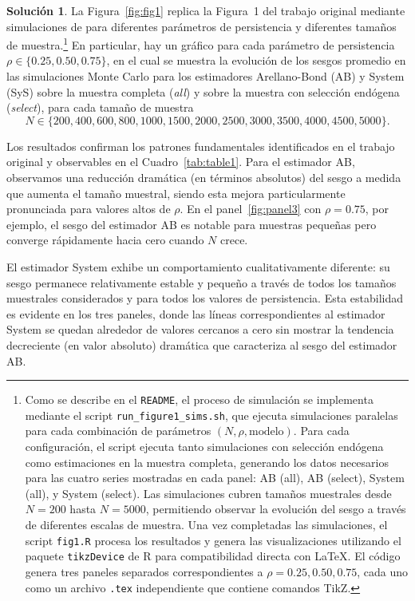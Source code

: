 \documentclass[12pt,letterpaper,reqno,oneside]{amsart}
\theoremstyle{problemstyle} %
\theoremstyle{definition} %
\newtheorem{solution}{Solución}[problem]
\begin{document}
\begin{solution}
  La Figura~\ref{fig:fig1} replica la Figura~1 del trabajo original mediante simulaciones de para diferentes parámetros de persistencia y diferentes tamaños de muestra.\footnote{Como se describe en el \texttt{README}, el proceso de simulación se implementa mediante el script \texttt{run\_figure1\_sims.sh}, que ejecuta simulaciones paralelas para cada combinación de parámetros $(N, \rho, \text{modelo})$.
    Para cada configuración, el script ejecuta tanto simulaciones con selección endógena como estimaciones en la muestra completa, generando los datos necesarios para las cuatro series mostradas en cada panel: AB (all), AB (select), System (all), y System (select).
    Las simulaciones cubren tamaños muestrales desde $N = 200$ hasta $N = 5000$, permitiendo observar la evolución del sesgo a través de diferentes escalas de muestra.
    Una vez completadas las simulaciones, el script \texttt{fig1.R} procesa los resultados y genera las visualizaciones utilizando el paquete \texttt{tikzDevice} de R para compatibilidad directa con \LaTeX.
    El código genera tres paneles separados correspondientes a $\rho = 0.25, 0.50, 0.75$, cada uno como un archivo \texttt{.tex} independiente que contiene comandos TikZ.}
  En particular, hay un gráfico para cada parámetro de persistencia $\rho \in \{0.25, 0.50, 0.75\}$, en el cual se muestra la evolución de los sesgos promedio en las simulaciones Monte Carlo para los estimadores Arellano-Bond (AB) y System (SyS) sobre la muestra completa (\emph{all}) y sobre la muestra con selección endógena (\emph{select}), para cada tamaño de muestra
  \begin{equation*}
    N \in \{200, 400, 600, 800, 1000, 1500, 2000, 2500, 3000, 3500, 4000, 4500, 5000\}.
  \end{equation*}

  Los resultados confirman los patrones fundamentales identificados en el trabajo original y observables en el Cuadro~\ref{tab:table1}.
  Para el estimador AB, observamos una reducción dramática (en términos absolutos) del sesgo a medida que aumenta el tamaño muestral, siendo esta mejora particularmente pronunciada para valores altos de $\rho$.
  En el panel~\ref{fig:panel3} con $\rho = 0.75$, por ejemplo, el sesgo del estimador AB es notable para muestras pequeñas pero converge rápidamente hacia cero cuando $N$ crece.

  El estimador System exhibe un comportamiento cualitativamente diferente: su sesgo permanece relativamente estable y pequeño a través de todos los tamaños muestrales considerados y para todos los valores de persistencia.
  Esta estabilidad es evidente en los tres paneles, donde las líneas correspondientes al estimador System se quedan alrededor de valores cercanos a cero sin mostrar la tendencia decreciente (en valor absoluto) dramática que caracteriza al sesgo del estimador AB.

\end{solution}
\end{document}
